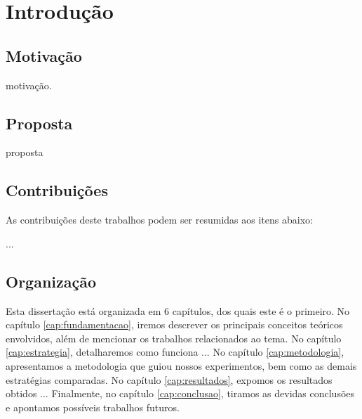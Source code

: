 \chapter{Introdução}
\section{Motivação}

motivação.

\section{Proposta}

proposta

\section{Contribuições}

As contribuições deste trabalhos podem ser resumidas aos itens abaixo:

...

\section{Organização}

Esta dissertação está organizada em 6 capítulos, dos quais este é o primeiro. No capítulo \ref{cap:fundamentacao}, iremos descrever os principais conceitos teóricos envolvidos, além de mencionar os trabalhos relacionados ao tema. No capítulo \ref{cap:estrategia}, detalharemos como funciona ... No capítulo \ref{cap:metodologia}, apresentamos a metodologia que guiou nossos experimentos, bem como as demais estratégias comparadas. No capítulo \ref{cap:resultados}, expomos os resultados obtidos ... Finalmente, no capítulo \ref{cap:conclusao}, tiramos as devidas conclusões e apontamos possíveis trabalhos futuros.
